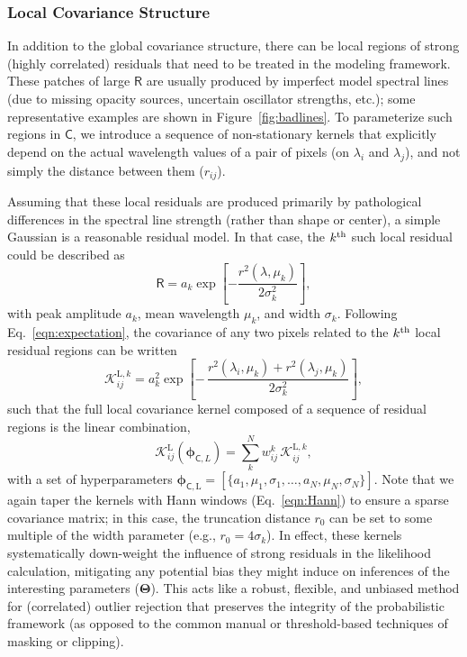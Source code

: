 \documentclass[iop,floatfix,numberedappendix,twocolappendix]{emulateapj}
\newcommand{\vR}{\mathsf{R}}
\newcommand{\vC}{\mathsf{C}}
\newcommand{\vT}{ {\bm \Theta}}
\newcommand{\vp}{ {\bm \phi}}
\newcommand{\KK}{\mathcal{K}}
\newcommand{\Klocal}{\KK^{\textrm{L}}}
\begin{document}
\subsubsection{Local Covariance Structure} \label{subsec:local_covariance}

In addition to the global covariance structure, there can be local regions of strong (highly 
correlated) residuals that need to be treated in the modeling framework.  These patches of large 
$\vR$ are usually produced by imperfect model spectral lines (due to missing opacity sources, 
uncertain oscillator strengths, etc.); some representative examples are shown in 
Figure~\ref{fig:badlines}.  To parameterize such regions in $\vC$, we introduce a sequence of 
non-stationary kernels that explicitly depend on the actual wavelength values of a pair of pixels 
(on $\lambda_i$ and $\lambda_j$), and not simply the distance between them ($r_{ij}$).  

Assuming that these local residuals are produced primarily by pathological differences in the 
spectral line strength (rather than shape or center), a simple Gaussian is a reasonable residual 
model.  In that case, the $k^{\rm th}$ such local residual could be described as
\begin{equation}
\vR = a_k \exp \left[ - \frac{r^2(\lambda,\mu_k)}{2\sigma_k^2} \right],
\end{equation}
with peak amplitude $a_k$, mean wavelength $\mu_k$, and width $\sigma_k$.  Following 
Eq.~\ref{eqn:expectation}, the covariance of any two pixels related to the $k^{\rm th}$ local 
residual regions can be written
\begin{equation} \label{eqn:kregion}
  \mathcal{K}^{\textrm{L},k}_{ij} = a_k^2 \exp \left [ - \, \frac{r^2(\lambda_i, \mu_k) + r^2(\lambda_j, \mu_k)}{2 \sigma_k^2}\right ],
\end{equation}
such that the full local covariance kernel composed of a sequence of residual regions is the linear 
combination,
\begin{equation} \label{eqn:klocal}
  \Klocal_{ij}(\vp_{{\mathsf C},L}) = \sum_k^N w^k_{ij} \, \mathcal{K}^{\textrm{L},k}_{ij},
\end{equation}
with a set of hyperparameters $\vp_{{\mathsf C},\textrm{L}} = [\{a_1, \mu_1, \sigma_1, \ldots, a_N,
\mu_N, \sigma_N\}]$.  Note that we again taper the kernels with Hann windows (Eq.~\ref{eqn:Hann}) to ensure
a sparse covariance matrix; in this case, the truncation distance $r_0$ can be set to some multiple
of the width parameter (e.g., $r_0 = 4\sigma_k$).  In effect, these kernels systematically
down-weight the influence of strong residuals in the likelihood calculation, mitigating any
potential bias they might induce on inferences of the interesting parameters ($\vT$).  This acts
like a robust, flexible, and unbiased method for (correlated) outlier rejection that preserves the
integrity of the probabilistic framework (as opposed to the common manual or threshold-based
techniques of masking or clipping). 
\end{document}
